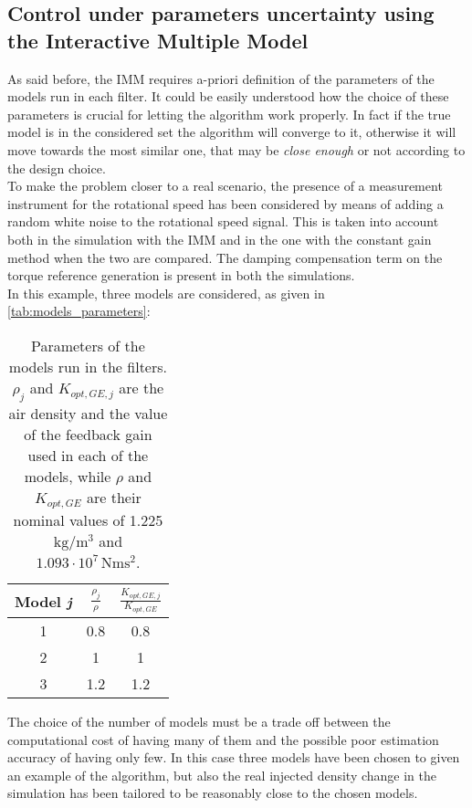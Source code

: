 \subsection{Control under parameters uncertainty using the Interactive Multiple Model}
As said before, the IMM requires a-priori definition of the parameters of the models run in each filter. It could be easily understood how the choice of these parameters is crucial for letting the algorithm work properly. In fact if the true model is in the considered set the algorithm will converge to it, otherwise it will move towards the most similar one, that may be \textit{close enough} or not according to the design choice.\\
To make the problem closer to a real scenario, the presence of a measurement instrument for the rotational speed has been considered by means of adding a random white noise to the rotational speed signal. This is taken into account both in the simulation with the IMM and in the one with the constant gain method when the two are compared. The damping compensation term on the torque reference generation is present in both the simulations.\\
In this example, three models are considered, as given in \autoref{tab:models_parameters}:
\begin{table}[!htbp]
  \centering
  \caption{Parameters of the models run in the filters. $\rho_j$ and $K_{opt,GE,j}$ are the air density and the value of the feedback gain used in each of the models, while $\rho$ and $K_{opt,GE}$ are their nominal values of 1.225 $\si{\kilo\gram\per\cubic\meter}$ and $1.093\cdot10^{7} \, \si{\newton\meter\square\second}$.}
  \begin{tabular}{ccc}
    \toprule
    Model \textit{j} & $\frac{\rho_j}{\rho}$ & $\frac{K_{opt,GE,j}}{K_{opt,GE}}$  \\
    \midrule
    1 & 0.8 & 0.8\\
    2 & 1 & 1\\
    3 & 1.2 & 1.2\\
    \bottomrule
  \end{tabular}
  \label{tab:models_parameters}
\end{table}

The choice of the number of models must be a trade off between the computational cost of having many of them and the possible poor estimation accuracy of having only few. In this case three models have been chosen to given an example of the algorithm, but also the real injected density change in the simulation has been tailored to be reasonably close to the chosen models.  

